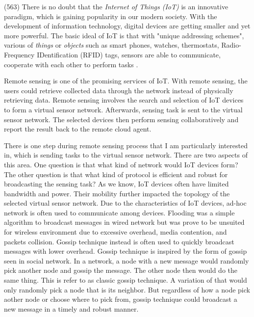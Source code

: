 (563)
There is no doubt that the \emph{Internet of Things (IoT)} is an innovative paradigm, \cite{Atzori} which is gaining popularity in our modern society.  With the development of information technology, digital devices are getting smaller and yet more powerful. The basic ideal of IoT is that with "unique addressing schemes", various of \emph{things} or \emph{objects} such as smart phones, watches, thermostats, Radio-Frequency IDentification (RFID) tags, sensors are able to communicate, cooperate with each other to perform tasks \cite{Atzori}.  

Remote sensing is one of the promising services of IoT. With remote sensing, the users could retrieve collected data through the network instead of physically retrieving data. Remote sensing involves the search and selection of IoT devices to form a virtual sensor network. Afterwards, sensing task is sent to the virtual sensor network. The selected devices then perform sensing collaboratively and report the result back to the remote cloud agent. 

There is one step during remote sensing process that I am particularly interested in, which is sending tasks to the virtual sensor network. There are two aspects of this area. One question is that what kind of network would IoT devices form? The other question is that what kind of protocol is efficient and robust for broadcasting the sensing task? As we know, IoT devices often have limited bandwidth and power. Their mobility further impacted the topology of the selected virtual sensor network. Due to the characteristics of IoT devices, ad-hoc network is often used to communicate among devices. Flooding was a simple algorithm to broadcast messages in wired network but was prove to be unsuited for wireless environment due to excessive overhead, media contention, and packets collision. Gossip technique instead is often used to quickly broadcast messages with lower overhead. Gossip technique is inspired by the form of gossip seen in social network. In a network, a node with a new message would randomly pick another node and gossip the message. The other node then would do the same thing. This is refer to as classic gossip technique. A variation of that would only randomly pick a node that is its neighbor. But regardless of how a node pick aother node or choose where to pick from, gossip technique could broadcast a new message in a timely and robust manner.


